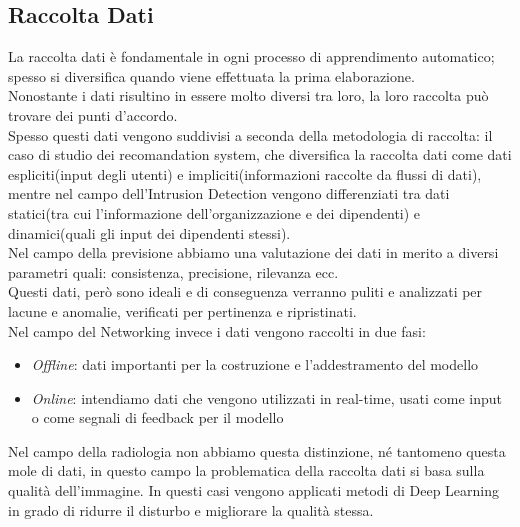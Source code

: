 \documentclass[../tesi.tex]{subfiles}
\begin{document}
\subsection{Raccolta Dati}
La raccolta dati è fondamentale in ogni processo di apprendimento automatico; spesso si diversifica quando viene effettuata la prima elaborazione.\\
Nonostante i dati risultino in essere molto diversi tra loro, la loro raccolta può trovare dei punti d’accordo.\\
Spesso questi dati vengono suddivisi a seconda della metodologia di raccolta: il caso di studio dei recomandation system, che diversifica la raccolta dati come dati espliciti(input degli utenti) e impliciti(informazioni raccolte da flussi di dati), mentre nel campo dell’Intrusion Detection vengono differenziati tra dati statici(tra cui l’informazione dell’organizzazione e dei dipendenti) e dinamici(quali gli input dei dipendenti stessi).\\
Nel campo della previsione abbiamo una valutazione dei dati in merito a diversi parametri quali: consistenza, precisione, rilevanza ecc. \\
Questi dati, però sono ideali e di conseguenza verranno puliti e analizzati per lacune e anomalie, verificati per pertinenza e ripristinati.\\
Nel campo del Networking invece i dati vengono raccolti in due fasi:
\begin{itemize}
  \item \textit{Offline}: dati importanti per la costruzione e l’addestramento del modello 
  \item \textit{Online}: intendiamo dati che vengono utilizzati in real-time, usati come input o come segnali di feedback per il modello
\end{itemize}
Nel campo della radiologia non abbiamo questa distinzione, né tantomeno questa mole di dati, in questo campo la problematica della raccolta dati si basa sulla qualità dell’immagine. In questi casi vengono applicati metodi di \Gls{Deep Learning} in grado di ridurre il disturbo e migliorare la qualità stessa.
\newpage
\end{document}
